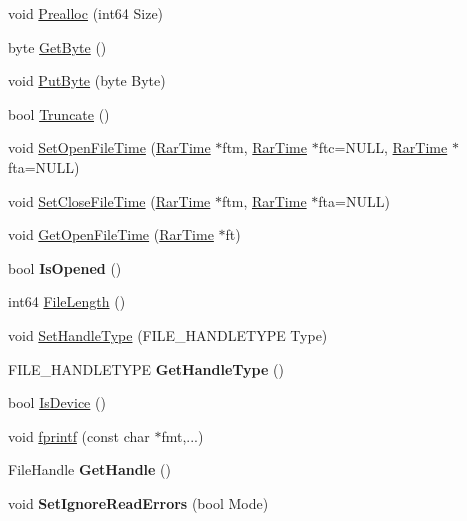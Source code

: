 \begin{DoxyCompactItemize}
\item 
void \hyperlink{class_file_ab331732c99a00a354ed5d9a66fe8d983}{Prealloc} (int64 Size)
\item 
byte \hyperlink{class_file_ab39c8afa7990da061eaf78bc892e2569}{Get\-Byte} ()
\item 
void \hyperlink{class_file_a46767ab04ecc36e9e841196ff00ed739}{Put\-Byte} (byte Byte)
\item 
bool \hyperlink{class_file_a0efa6caf9619e65a1d0cc431a03d4aa1}{Truncate} ()
\item 
void \hyperlink{class_file_aa63b65699e48434f94d8262d063fc408}{Set\-Open\-File\-Time} (\hyperlink{class_rar_time}{Rar\-Time} $\ast$ftm, \hyperlink{class_rar_time}{Rar\-Time} $\ast$ftc=N\-U\-L\-L, \hyperlink{class_rar_time}{Rar\-Time} $\ast$fta=N\-U\-L\-L)
\item 
void \hyperlink{class_file_a6a77f5d63a5f5aeee1a404803d50c2e1}{Set\-Close\-File\-Time} (\hyperlink{class_rar_time}{Rar\-Time} $\ast$ftm, \hyperlink{class_rar_time}{Rar\-Time} $\ast$fta=N\-U\-L\-L)
\item 
void \hyperlink{class_file_a230eb360fb1fc3223cf15f13f7a9b33f}{Get\-Open\-File\-Time} (\hyperlink{class_rar_time}{Rar\-Time} $\ast$ft)
\item 
\hypertarget{class_file_afdbf269bc408846178672dceef1b2b64}{bool {\bfseries Is\-Opened} ()}\label{class_file_afdbf269bc408846178672dceef1b2b64}

\item 
int64 \hyperlink{class_file_a2eca8a1052e0c5ade1bd04c337fbb539}{File\-Length} ()
\item 
void \hyperlink{class_file_a168c8cc895ab015d5afa4e66ba2b1515}{Set\-Handle\-Type} (F\-I\-L\-E\-\_\-\-H\-A\-N\-D\-L\-E\-T\-Y\-P\-E Type)
\item 
\hypertarget{class_file_a8be4cf189695c60e8104a6d983383fa6}{F\-I\-L\-E\-\_\-\-H\-A\-N\-D\-L\-E\-T\-Y\-P\-E {\bfseries Get\-Handle\-Type} ()}\label{class_file_a8be4cf189695c60e8104a6d983383fa6}

\item 
bool \hyperlink{class_file_a82de52af3430e61380868d0a88d19a43}{Is\-Device} ()
\item 
void \hyperlink{class_file_a0573c92d21fca7ef9d223bf5ee1e4e39}{fprintf} (const char $\ast$fmt,...)
\item 
\hypertarget{class_file_ae86874ceabe5161fa90e6d66888d73c1}{File\-Handle {\bfseries Get\-Handle} ()}\label{class_file_ae86874ceabe5161fa90e6d66888d73c1}

\item 
\hypertarget{class_file_a763480c351248653d7d472a268034ed4}{void {\bfseries Set\-Ignore\-Read\-Errors} (bool Mode)}\label{class_file_a763480c351248653d7d472a268034ed4}


\end{DoxyCompactItemize}
